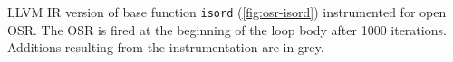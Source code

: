 \label{fig:osr-isordfrom} LLVM IR version of base function {\tt isord} (\myfigure\ref{fig:osr-isord}) instrumented for open OSR. The OSR is fired at the beginning of the loop body after 1000 iterations. Additions resulting from the instrumentation are in grey.

